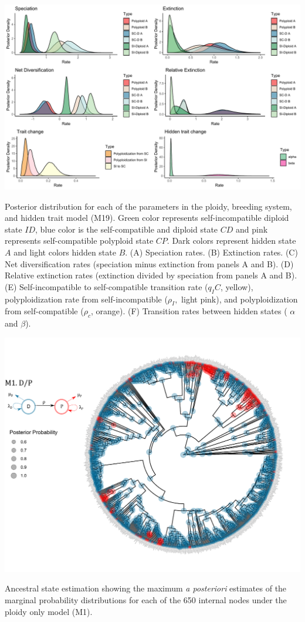 \begin{suppfigure}
\includegraphics[width=\textwidth]{figS8.pdf}
\caption{Posterior distribution for each of the parameters in the ploidy, breeding system, and hidden trait model (M19). Green color represents self-incompatible diploid state $ID$, blue color is the self-compatible and diploid state $CD$ and pink represents self-compatible polyploid state $CP$. Dark colors represent hidden state $A$ and light colors hidden state $B$.  (A) Speciation rates. (B) Extinction rates. (C) Net diversification rates (speciation minus extinction from panels A and B). (D) Relative extinction rates (extinction divided by speciation from panels A and B). (E) Self-incompatible to self-compatible transition rate ($q_IC$, yellow), polyploidization rate from self-incompatible ($\rho_I,$ light pink), and polyploidization from self-compatible ($\rho_c$, orange). (F) Transition rates between hidden states ( $\alpha$ and $\beta$).}%
\label{suppfigure:IDCDCPnodipAB}
\end{suppfigure}

\begin{suppfigure}
\includegraphics[width=\textwidth]{figS9.pdf}
\caption{Ancestral state estimation showing the maximum \emph{a posteriori} estimates of the marginal probability distributions for each of the 650 internal nodes under  the ploidy only model (M1). } %
\label{suppfigure:DPnodipasr}
\end{suppfigure}



